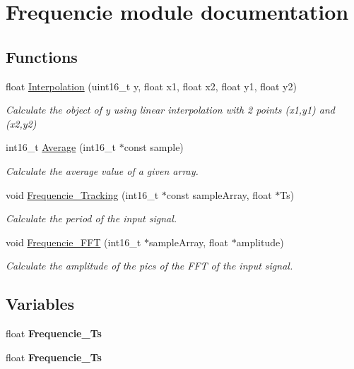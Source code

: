 \hypertarget{group___frequencie__module}{}\section{Frequencie module documentation}
\label{group___frequencie__module}
\subsection*{Functions}
\begin{DoxyCompactItemize}
\item 
float \hyperlink{group___frequencie__module_gadb3e5a4fd082adf7933bae7a82e21d0a}{Interpolation} (uint16\+\_\+t y, float x1, float x2, float y1, float y2)
\begin{DoxyCompactList}\small\item\em Calculate the object of y using linear interpolation with 2 points (x1,y1) and (x2,y2) \end{DoxyCompactList}\item 
int16\+\_\+t \hyperlink{group___frequencie__module_ga2e0fb698150c1de92af41dd1a2db80a2}{Average} (int16\+\_\+t $\ast$const sample)
\begin{DoxyCompactList}\small\item\em Calculate the average value of a given array. \end{DoxyCompactList}\item 
void \hyperlink{group___frequencie__module_gae419a54c77a33cce33d54db76113da40}{Frequencie\+\_\+\+Tracking} (int16\+\_\+t $\ast$const sample\+Array, float $\ast$Ts)
\begin{DoxyCompactList}\small\item\em Calculate the period of the input signal. \end{DoxyCompactList}\item 
void \hyperlink{group___frequencie__module_ga827ee7dcb292c550565952392fbb5ddd}{Frequencie\+\_\+\+F\+F\+T} (int16\+\_\+t $\ast$sample\+Array, float $\ast$amplitude)
\begin{DoxyCompactList}\small\item\em Calculate the amplitude of the pics of the F\+F\+T of the input signal. \end{DoxyCompactList}\end{DoxyCompactItemize}
\subsection*{Variables}
\begin{DoxyCompactItemize}
\item 
\hypertarget{group___frequencie__module_gafe7248b27df8dfb738e2effe7c584f7f}{}float {\bfseries Frequencie\+\_\+\+Ts}\label{group___frequencie__module_gafe7248b27df8dfb738e2effe7c584f7f}

\item 
\hypertarget{group___frequencie__module_gafe7248b27df8dfb738e2effe7c584f7f}{}float {\bfseries Frequencie\+\_\+\+Ts}\label{group___frequencie__module_gafe7248b27df8dfb738e2effe7c584f7f}

\end{DoxyCompactItemize}


